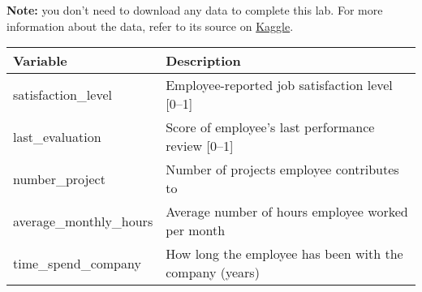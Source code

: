 \documentclass[11pt]{article}
\begin{document}
\textbf{Note:} you don't need to download any data to complete this lab.
For more information about the data, refer to its source on
\href{https://www.kaggle.com/datasets/mfaisalqureshi/hr-analytics-and-job-prediction?select=HR_comma_sep.csv}{Kaggle}.

\begin{longtable}[]{@{}ll@{}}
\toprule
\begin{minipage}[b]{0.47\columnwidth}\raggedright
Variable\strut
\end{minipage} & \begin{minipage}[b]{0.47\columnwidth}\raggedright
Description\strut
\end{minipage}\tabularnewline
\midrule
\endhead
\begin{minipage}[t]{0.47\columnwidth}\raggedright
satisfaction\_level\strut
\end{minipage} & \begin{minipage}[t]{0.47\columnwidth}\raggedright
Employee-reported job satisfaction level {[}0--1{]}\strut
\end{minipage}\tabularnewline
\begin{minipage}[t]{0.47\columnwidth}\raggedright
last\_evaluation\strut
\end{minipage} & \begin{minipage}[t]{0.47\columnwidth}\raggedright
Score of employee's last performance review {[}0--1{]}\strut
\end{minipage}\tabularnewline
\begin{minipage}[t]{0.47\columnwidth}\raggedright
number\_project\strut
\end{minipage} & \begin{minipage}[t]{0.47\columnwidth}\raggedright
Number of projects employee contributes to\strut
\end{minipage}\tabularnewline
\begin{minipage}[t]{0.47\columnwidth}\raggedright
average\_monthly\_hours\strut
\end{minipage} & \begin{minipage}[t]{0.47\columnwidth}\raggedright
Average number of hours employee worked per month\strut
\end{minipage}\tabularnewline
\begin{minipage}[t]{0.47\columnwidth}\raggedright
time\_spend\_company\strut
\end{minipage} & \begin{minipage}[t]{0.47\columnwidth}\raggedright
How long the employee has been with the company (years)\strut

\end{minipage}
\end{longtable}
\end{document}
